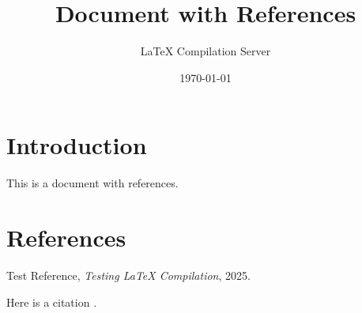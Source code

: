 \documentclass{article}
\title{Document with References}
\author{LaTeX Compilation Server}
\date{\today}
\begin{document}
\maketitle

\section{Introduction}
This is a document with references.

\section{References}
\begin{thebibliography}{9}
Test Reference, \emph{Testing LaTeX Compilation}, 2025.
\end{thebibliography}

Here is a citation \cite{test}.
\end{document}
